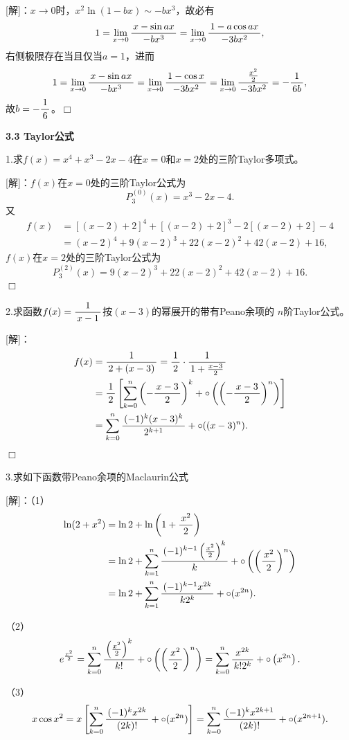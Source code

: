 [解]：$x\to 0$时，$x^2\ln(1-bx)\sim-bx^3$，故必有
$$1=\lim\limits_{x\to{0}}\displaystyle\frac{\,{x-\sin ax}\,}{\,{-bx^3}\,}
=\lim\limits_{x\to{0}}\displaystyle\frac{\,{1-a\cos ax}\,}{\,{-3bx^2}\,},$$
右侧极限存在当且仅当$a=1$，进而
$$1=\lim\limits_{x\to{0}}\displaystyle\frac{\,{x-\sin ax}\,}{\,{-bx^3}\,}
=\lim\limits_{x\to{0}}\displaystyle\frac{\,{1-\cos x}\,}{\,{-3bx^2}\,}
=\lim\limits_{x\to{0}}\displaystyle\frac{\,{\frac{x^2}2}\,}{\,{-3bx^2}\,}=-\displaystyle\frac{\,{1}\,}{\,{6b}\,},$$
故$b=-\displaystyle\frac{\,{1}\,}{\,{6}\,}$。\hfill$\Box$

\begin{center}
	\bf 3.3 Taylor公式
\end{center}

\bigskip

1.求$f(x)=x^4+x^3-2x-4$在$x=0$和$x=2$处的三阶Taylor多项式。

[解]：$f(x)$在$x=0$处的三阶Taylor公式为
$$P^{(0)}_3(x)=x^3-2x-4.$$
又
\begin{align*}
	f(x)&=[(x-2)+2]^4+[(x-2)+2]^3-2[(x-2)+2]-4\\
	&=(x-2)^4+9(x-2)^3+22(x-2)^2+42(x-2)+16,
\end{align*}
$f(x)$在$x=2$处的三阶Taylor公式为
$$P^{(2)}_3(x)=9(x-2)^3+22(x-2)^2+42(x-2)+16.$$
\hfill$\Box$

\bigskip

2.求函数$f(x)=\displaystyle\frac{\,{1}\,}{\,{x-1}\,}$按$(x-3)$的幂展开的带有Peano余项的
$n$阶Taylor公式。

[解]：
\begin{align*}
	f(x)&=\displaystyle\frac{\,{1}\,}{\,{2+(x-3)}\,}=\displaystyle\frac{\,{1}\,}{\,{2}\,}\cdot\displaystyle\frac{\,{1}\,}{\,{1+\frac{x-3}2}\,}\\
	&=\displaystyle\frac{\,{1}\,}{\,{2}\,}\left[\sum\limits_{k=0}^n\left(-\displaystyle\frac{\,{x-3}\,}{\,{2}\,}\right)^k
	+\circ\left(\left(-\displaystyle\frac{\,{x-3}\,}{\,{2}\,}\right)^n\right)\right]\\
	&=\sum\limits_{k=0}^n\displaystyle\frac{\,{(-1)^k(x-3)^k}\,}{\,{2^{k+1}}\,}+\circ((x-3)^n).
\end{align*}
\hfill$\Box$

\bigskip

3.求如下函数带Peano余项的Maclaurin公式

[解]：（1）
\begin{align*}
	\ln(2+x^2)&=\ln2+\ln\left(1+\displaystyle\frac{\,{x^2}\,}{\,{2}\,}\right)\\
	&=\ln2+\sum\limits_{k=1}^n\displaystyle\frac{\,{(-1)^{k-1}\left(\frac{x^2}{2}\right)^k}\,}{\,{k}\,}
	+\circ\left(\left(\displaystyle\frac{\,{x^2}\,}{\,{2}\,}\right)^n\right)\\
	&=\ln2+\sum\limits_{k=1}^n\displaystyle\frac{\,{(-1)^{k-1}x^{2k}}\,}{\,{k2^k}\,}
	+\circ(x^{2n}).
\end{align*}

（2）
$$
	e^{\frac{x^2}2}
	=\sum\limits_{k=0}^n\displaystyle\frac{\,{\left(\frac{x^2}2\right)^k}\,}{\,{k!}\,}
	+\circ\left(\left(\displaystyle\frac{\,{x^2}\,}{\,{2}\,}\right)^n\right)
	=\sum\limits_{k=0}^n\displaystyle\frac{\,{x^{2k}}\,}{\,{k!2^k}\,}
	+\circ\left(x^{2n}\right).
$$

（3）
$$
	x\cos x^2
	=x\left[\sum\limits_{k=0}^n\displaystyle\frac{\,{(-1)^kx^{2k}}\,}{\,{(2k)!}\,}
	+\circ(x^{2n})\right]
	=\sum\limits_{k=0}^n\displaystyle\frac{\,{(-1)^kx^{2k+1}}\,}{\,{(2k)!}\,}
	+\circ(x^{2n+1}).
$$

